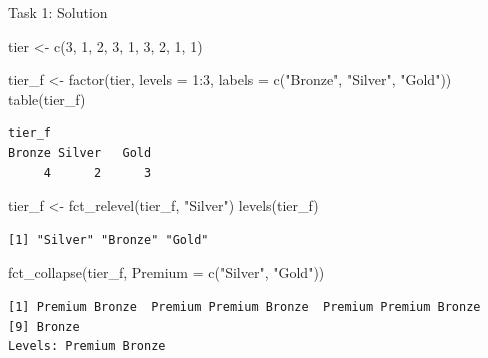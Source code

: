 \documentclass[
  ignorenonframetext,
  aspectratio=169,
]{beamer}
\newenvironment{Shaded}{\begin{snugshade}}{\end{snugshade}}
\newcommand{\AttributeTok}[1]{\textcolor[rgb]{0.40,0.45,0.13}{#1}}
\newcommand{\DecValTok}[1]{\textcolor[rgb]{0.68,0.00,0.00}{#1}}
\newcommand{\FunctionTok}[1]{\textcolor[rgb]{0.28,0.35,0.67}{#1}}
\newcommand{\NormalTok}[1]{\textcolor[rgb]{0.00,0.23,0.31}{#1}}
\newcommand{\OtherTok}[1]{\textcolor[rgb]{0.00,0.23,0.31}{#1}}
\newcommand{\SpecialCharTok}[1]{\textcolor[rgb]{0.37,0.37,0.37}{#1}}
\newcommand{\StringTok}[1]{\textcolor[rgb]{0.13,0.47,0.30}{#1}}
\begin{document}
\begin{frame}[fragile]{Task 1: Solution}
\protect\hypertarget{task-1-solution}{}
\begin{Shaded}
\begin{Highlighting}[]
\NormalTok{tier }\OtherTok{\textless{}{-}} \FunctionTok{c}\NormalTok{(}\DecValTok{3}\NormalTok{, }\DecValTok{1}\NormalTok{, }\DecValTok{2}\NormalTok{, }\DecValTok{3}\NormalTok{, }\DecValTok{1}\NormalTok{, }\DecValTok{3}\NormalTok{, }\DecValTok{2}\NormalTok{, }\DecValTok{1}\NormalTok{, }\DecValTok{1}\NormalTok{)}

\NormalTok{tier\_f }\OtherTok{\textless{}{-}} \FunctionTok{factor}\NormalTok{(tier, }\AttributeTok{levels =} \DecValTok{1}\SpecialCharTok{:}\DecValTok{3}\NormalTok{, }\AttributeTok{labels =} \FunctionTok{c}\NormalTok{(}\StringTok{"Bronze"}\NormalTok{, }\StringTok{"Silver"}\NormalTok{, }\StringTok{"Gold"}\NormalTok{))}
\FunctionTok{table}\NormalTok{(tier\_f)}
\end{Highlighting}
\end{Shaded}

\begingroup\tiny\color{darkgray}

\begin{verbatim}
tier_f
Bronze Silver   Gold 
     4      2      3 
\end{verbatim}

\endgroup

\begin{Shaded}
\begin{Highlighting}[]
\NormalTok{tier\_f }\OtherTok{\textless{}{-}} \FunctionTok{fct\_relevel}\NormalTok{(tier\_f, }\StringTok{"Silver"}\NormalTok{)}
\FunctionTok{levels}\NormalTok{(tier\_f)}
\end{Highlighting}
\end{Shaded}

\begingroup\tiny\color{darkgray}

\begin{verbatim}
[1] "Silver" "Bronze" "Gold"  
\end{verbatim}

\endgroup

\begin{Shaded}
\begin{Highlighting}[]
\FunctionTok{fct\_collapse}\NormalTok{(tier\_f, }\AttributeTok{Premium =} \FunctionTok{c}\NormalTok{(}\StringTok{"Silver"}\NormalTok{, }\StringTok{"Gold"}\NormalTok{))}
\end{Highlighting}
\end{Shaded}

\begingroup\tiny\color{darkgray}

\begin{verbatim}
[1] Premium Bronze  Premium Premium Bronze  Premium Premium Bronze 
[9] Bronze 
Levels: Premium Bronze
\end{verbatim}

\endgroup
\end{frame}
\end{document}
